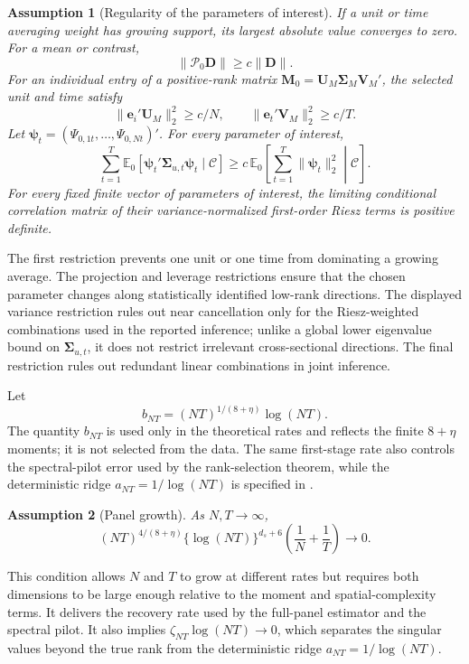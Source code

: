 \documentclass[11pt]{article}
\numberwithin{equation}{section}
\newtheorem{assumption}{Assumption}
\theoremstyle{remark}
\newcommand{\Ezero}{\mathbb E_0}
\newcommand{\be}{\bm e}
\newcommand{\bD}{\bm D}
\newcommand{\bM}{\bm M}
\newcommand{\bU}{\bm U}
\newcommand{\bV}{\bm V}
\newcommand{\bSigma}{\bm\Sigma}
\newcommand{\calP}{\mathcal P}
\begin{document}
\begin{assumption}[Regularity of the parameters of interest]
\label{a:target}
If a unit or time averaging weight has growing support, its largest absolute value converges to zero. For a mean or contrast,
$$
\|\calP_0\bD\|\ge c\|\bD\|.
$$
For an individual entry of a positive-rank matrix $\bM_0=\bU_M\bSigma_M\bV_M'$, the selected unit and time satisfy
$$
\|\be_i'\bU_M\|_2^2\ge c/N,
\qquad
\|\be_t'\bV_M\|_2^2\ge c/T.
$$
Let $\bm\psi_t=(\Psi_{0,1t},\ldots,\Psi_{0,Nt})'$. For every parameter of interest,
$$
\sum_{t=1}^{T}
\Ezero[
\bm\psi_t'\bm\Sigma_{u,t}\bm\psi_t
\mid\mathscr C]
\ge
c\,
\Ezero\!\left[
\sum_{t=1}^{T}\|\bm\psi_t\|_2^2
\middle|\mathscr C
\right].
$$
For every fixed finite vector of parameters of interest, the limiting conditional correlation matrix of their variance-normalized first-order Riesz terms is positive definite.
\end{assumption}
The first restriction prevents one unit or one time from dominating a growing average. The projection and leverage restrictions ensure that the chosen parameter changes along statistically identified low-rank directions. The displayed variance restriction rules out near cancellation only for the Riesz-weighted combinations used in the reported inference; unlike a global lower eigenvalue bound on $\bm\Sigma_{u,t}$, it does not restrict irrelevant cross-sectional directions. The final restriction rules out redundant linear combinations in joint inference.

Let
\begin{equation}
\label{eq:tail_scale}
b_{NT}=(NT)^{1/(8+\eta)}\log(NT).
\end{equation}
The quantity $b_{NT}$ is used only in the theoretical rates and reflects the finite $8+\eta$ moments; it is not selected from the data. The same first-stage rate also controls the spectral-pilot error used by the rank-selection theorem, while the deterministic ridge $a_{NT}=1/\log(NT)$ is specified in .

\begin{assumption}[Panel growth]
\label{a:growth}
As $N,T\to\infty$,
\begin{equation}
\label{eq:panel_growth}
(NT)^{4/(8+\eta)}
\{\log(NT)\}^{d_s+6}
\left(\frac1N+\frac1T\right)
\longrightarrow0.
\end{equation}
\end{assumption}
This condition allows $N$ and $T$ to grow at different rates but requires both dimensions to be large enough relative to the moment and spatial-complexity terms. It delivers the recovery rate used by the full-panel estimator and the spectral pilot. It also implies $\zeta_{NT}\log(NT)\to0$, which separates the singular values beyond the true rank from the deterministic ridge $a_{NT}=1/\log(NT)$.
\end{document}

